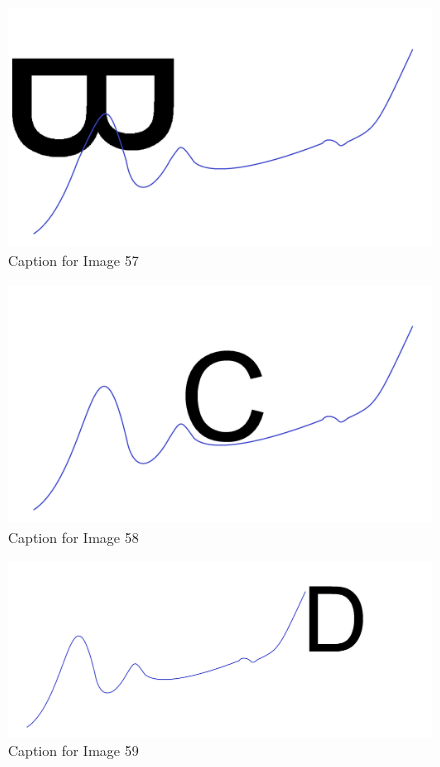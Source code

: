 \documentclass{article}
\begin{document}
\vspace{10pt}

\begin{figure}[!htb]
    \centering
    \includegraphics[width=\textwidth]{imgs/57.png}
    \caption{Caption for Image 57}
\end{figure}

\vspace{10pt}

\begin{figure}[!htb]
    \centering
    \includegraphics[width=\textwidth]{imgs/58.png}
    \caption{Caption for Image 58}
\end{figure}

\vspace{10pt}

\begin{figure}[!htb]
    \centering
    \includegraphics[width=\textwidth]{imgs/59.png}
    \caption{Caption for Image 59}
\end{figure}
\end{document}

